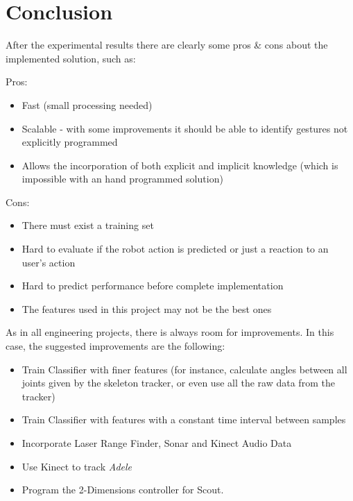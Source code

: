 \section{Conclusion}
After the experimental results there are clearly some pros \& cons about the implemented solution, such as:


Pros:
\begin{itemize}
\item Fast (small processing needed)
\item Scalable - with some improvements it should be able to identify gestures not explicitly programmed
\item Allows the incorporation of both explicit and implicit knowledge (which is impossible with an hand programmed solution)
\end{itemize}
Cons:
\begin{itemize}
\item There must exist a training set
\item Hard to evaluate if the robot action is predicted or just a reaction to an user's action
\item Hard to predict performance before complete implementation
\item The features used in this project may not be the best ones
\end{itemize}

As in all engineering projects, there is always room for improvements. In this case, the suggested improvements are the following:
\begin{itemize}
\item Train Classifier with finer features (for instance, calculate angles between all joints given by the skeleton tracker, or even use all the raw data from the tracker)
\item Train Classifier with features with a constant time interval between samples
\item Incorporate Laser Range Finder, Sonar and Kinect Audio Data
\item Use Kinect to track \textit{Adele}
\item Program the 2-Dimensions controller for Scout.
\end{itemize}
